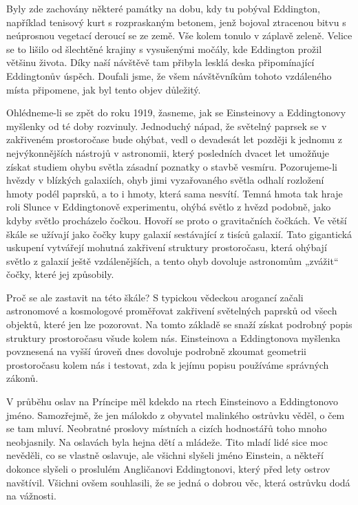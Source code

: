   Byly zde zachovány některé památky na dobu, kdy tu pobýval Eddington, například tenisový kurt s
  rozpraskaným betonem, jenž bojoval ztracenou bitvu s neúprosnou vegetací deroucí se ze země. Vše
  kolem tonulo v záplavě zeleně. Velice se to lišilo od šlechtěné krajiny s vysušenými močály, kde
  Eddington prožil většinu života. Díky naší návštěvě tam přibyla lesklá deska připomínající
  Eddingtonův úspěch. Doufali jsme, že všem návštěvníkům tohoto vzdáleného místa připomene, jak byl
  tento objev důležitý. 
  
  Ohlédneme-li se zpět do roku 1919, žasneme, jak se Einsteinovy a Eddingtonovy myšlenky od té doby
  rozvinuly. Jednoduchý nápad, že světelný paprsek se v zakřiveném prostoročase bude ohýbat, vedl o
  devadesát let později k jednomu z nejvýkonnějších nástrojů v astronomii, který posledních dvacet
  let umožňuje získat studiem ohybu světla zásadní poznatky o stavbě vesmíru. Pozorujeme-li hvězdy v
  blízkých galaxiích, ohyb jimi vyzařovaného světla odhalí rozložení hmoty podél paprsků, a to i
  hmoty, která sama nesvítí. Temná hmota tak hraje roli Slunce v Eddingtonově experimentu, ohýbá
  světlo z hvězd podobně, jako kdyby světlo procházelo čočkou. Hovoří se proto o gravitačních
  čočkách. Ve větší škále se užívají jako čočky kupy galaxií sestávající z tisíců galaxií. Tato
  gigantická uskupení vytvářejí mohutná zakřivení struktury prostoročasu, která ohýbají světlo z
  galaxií ještě vzdálenějších, a tento ohyb dovoluje astronomům „zvážit“ čočky, které jej způsobily.
  
  Proč se ale zastavit na této škále? S typickou vědeckou arogancí začali astronomové a kosmologové
  proměřovat zakřivení světelných paprsků od všech objektů, které jen lze pozorovat. Na tomto
  základě se snaží získat podrobný popis struktury prostoročasu všude kolem nás. Einsteinova a
  Eddingtonova myšlenka povznesená na vyšší úroveň dnes dovoluje podrobně zkoumat geometrii
  prostoročasu kolem nás i testovat, zda k jejímu popisu používáme správných zákonů. 
  
  V průběhu oslav na Príncipe měl kdekdo na rtech Einsteinovo a Eddingtonovo jméno. Samozřejmě, že
  jen málokdo z obyvatel malinkého ostrůvku věděl, o čem se tam mluví. Neobratné proslovy místních a
  cizích hodnostářů toho mnoho neobjasnily. Na oslavách byla hejna dětí a mládeže. Tito mladí lidé
  sice moc nevěděli, co se vlastně oslavuje, ale všichni slyšeli jméno Einstein, a někteří dokonce
  slyšeli o proslulém Angličanovi Eddingtonovi, který před lety ostrov navštívil. Všichni ovšem
  souhlasili, že se jedná o dobrou věc, která ostrůvku dodá na vážnosti. 
  
